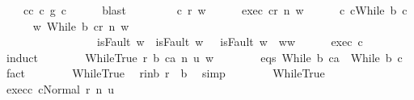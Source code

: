 \begin{isabellebody}
\ \ \ \ c{\isacharprime}{\isacharprime}{\isacharunderscore}c{\isacharprime}{\isacharcolon}\ {\isachardoublequoteopen}c{\isacharprime}{\isacharprime}\ {\isasymsubseteq}\isactrlsub g\ c{\isacharprime}{\isachardoublequoteclose}\isanewline
\ \ \ \ \isamarkupfalse%
\ blast\isanewline
\ \ \isacommand{{\isacharbraceleft}}\isamarkupfalse%
\isanewline
\ \ \ \ \isamarkupfalse%
\ c\ r\ w\isanewline
\ \ \ \ \isamarkupfalse%
\ exec{\isacharcolon}\ {\isachardoublequoteopen}{\isasymGamma}{\isasymturnstile}{\isasymlangle}c{\isacharcomma}r{\isasymrangle}\ {\isacharequal}n{\isasymRightarrow}\ w{\isachardoublequoteclose}\isanewline
\ \ \ \ \isamarkupfalse%
\ c{\isacharcolon}\ {\isachardoublequoteopen}c{\isacharequal}While\ b\ c{\isacharprime}{\isacharprime}{\isachardoublequoteclose}\isanewline
\ \ \ \ \isamarkupfalse%
\ {\isachardoublequoteopen}{\isasymexists}w{\isacharprime}{\isachardot}\ {\isasymGamma}{\isasymturnstile}{\isasymlangle}While\ b\ c{\isacharprime}{\isacharcomma}r{\isasymrangle}\ {\isacharequal}n{\isasymRightarrow}\ w{\isacharprime}\ {\isasymand}\isanewline
\ \ \ \ \ \ \ \ \ \ \ \ \ \ \ \ \ {\isacharparenleft}isFault\ w\ {\isasymlongrightarrow}\ isFault\ w{\isacharprime}{\isacharparenright}\ {\isasymand}\ {\isacharparenleft}{\isasymnot}\ isFault\ w{\isacharprime}\ {\isasymlongrightarrow}\ w{\isacharprime}{\isacharequal}w{\isacharparenright}{\isachardoublequoteclose}\isanewline
\ \ \ \ \isamarkupfalse%
\ exec\ c\isanewline
\ \ \ \ \isamarkupfalse%
\ {\isacharparenleft}induct{\isacharparenright}\isanewline
\ \ \ \ \ \ \isamarkupfalse%
\ {\isacharparenleft}WhileTrue\ r\ b{\isacharprime}\ ca\ n\ u\ w{\isacharparenright}\isanewline
\ \ \ \ \ \ \isamarkupfalse%
\ eqs{\isacharcolon}\ {\isachardoublequoteopen}While\ b{\isacharprime}\ ca\ {\isacharequal}\ While\ b\ c{\isacharprime}{\isacharprime}{\isachardoublequoteclose}\ \isamarkupfalse%
\ fact\isanewline
\ \ \ \ \ \ \isamarkupfalse%
\ WhileTrue\ \isamarkupfalse%
\ r{\isacharunderscore}in{\isacharunderscore}b{\isacharcolon}\ {\isachardoublequoteopen}r\ {\isasymin}\ b{\isachardoublequoteclose}\ \isamarkupfalse%
\ simp\isanewline
\ \ \ \ \ \ \isamarkupfalse%
\ WhileTrue\ \isamarkupfalse%
\ exec{\isacharunderscore}c{\isacharprime}{\isacharprime}{\isacharcolon}\ {\isachardoublequoteopen}{\isasymGamma}{\isasymturnstile}{\isasymlangle}c{\isacharprime}{\isacharprime}{\isacharcomma}Normal\ r{\isasymrangle}\ {\isacharequal}n{\isasymRightarrow}\ u{\isachardoublequoteclose}\ \isamarkupfalse%

\end{isabellebody}
